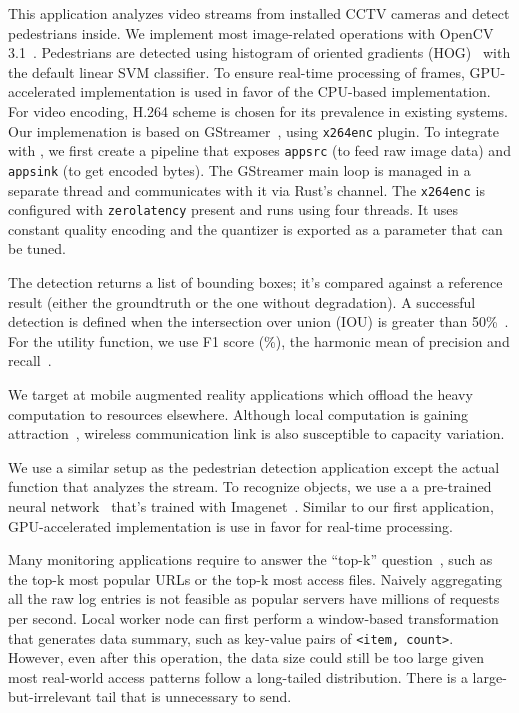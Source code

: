  This application analyzes video streams from
installed CCTV cameras and detect pedestrians inside. We implement most
image-related operations with OpenCV 3.1~\cite{opencvlibrary}. Pedestrians are
detected using histogram of oriented gradients (HOG)~\cite{dalal2005histograms}
with the default linear SVM classifier. To ensure real-time processing of
frames, GPU-accelerated implementation is used in favor of the CPU-based
implementation. For video encoding, H.264 scheme is chosen for its prevalence in
existing systems. Our implemenation is based on GStreamer~\cite{gstreamer},
using \texttt{x264enc} plugin. To integrate with \sysname{}, we first create a
pipeline that exposes \texttt{appsrc} (to feed raw image data) and
\texttt{appsink} (to get encoded bytes). The GStreamer main loop is managed in a
separate thread and \sysname{} communicates with it via Rust's channel. The
\texttt{x264enc} is configured with \texttt{zerolatency} present and runs using
four threads. It uses constant quality encoding and the quantizer is exported as
a parameter that can be tuned.

The detection returns a list of bounding boxes; it's compared against a
reference result (either the groundtruth or the one without degradation). A
successful detection is defined when the intersection over union (IOU) is
greater than 50\%~\cite{everingham2010pascal}. For the utility function, we use
F1 score (\%), the harmonic mean of precision and
recall~\cite{Rijsbergen:1979:IR:539927}.

 We target at mobile augmented reality applications
which offload the heavy computation to resources elsewhere. Although local
computation is gaining attraction~\cite{satyanarayanan2009case, zhang2015cloud},
wireless communication link is also susceptible to capacity variation.

We use a similar setup as the pedestrian detection application except the actual
function that analyzes the stream. To recognize objects, we use a a pre-trained
neural network~\cite{darknet13} that's trained with
Imagenet~\cite{krizhevsky2012imagenet}. Similar to our first application,
GPU-accelerated implementation is use in favor for real-time processing.

 Many monitoring applications require to answer the
``top-k'' question~\cite{babcock2003distributed}, such as the top-k most popular
URLs or the top-k most access files. Naively aggregating all the raw log entries
is not feasible as popular servers have millions of requests per second. Local
worker node can first perform a window-based transformation that generates data
summary, such as key-value pairs of \texttt{<item, count>}. However, even after
this operation, the data size could still be too large given most real-world
access patterns follow a long-tailed distribution. There is a
large-but-irrelevant tail that is unnecessary to send.

